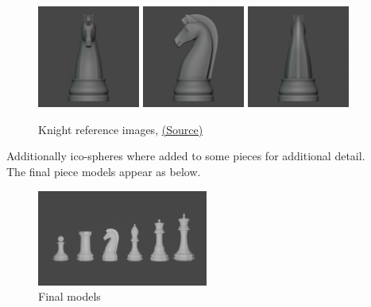 \documentclass[11pt]{article}
\begin{document}
\begin{figure}[htbp]
\begin{center}
\includegraphics[width=0.3\textwidth]{ref/knight front.jpg}
\includegraphics[width=0.3\textwidth]{ref/knight right.jpg}
\includegraphics[width=0.3\textwidth]{ref/knight back.jpg}
\end{center}
\caption{Knight reference images, \href{https://imgur.com/a/Pg9WYII}{(Source)}}
\end{figure}

Additionally ico-spheres where added to some pieces for additional detail.\\

The final piece models appear as below.
\begin{figure}[htbp]
\centering
\includegraphics[width=0.5\textwidth]{Images/Pieces.png}
\caption{Final models}
\end{figure}
\newpage
\end{document}
